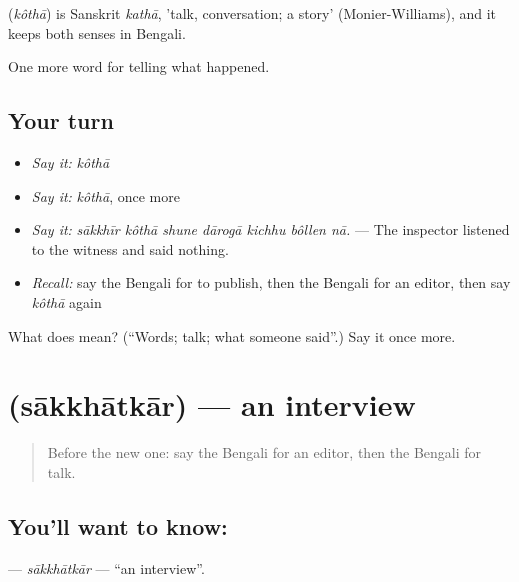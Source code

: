 \begin{cousinweb}
\textbf{} (\emph{kôthā}) is Sanskrit \emph{kathā}, 'talk, conversation; a story' (Monier-Williams), and it keeps both senses in Bengali.
\end{cousinweb}

\begin{grammarlens}[title={What you've built}]
One more word for telling what happened.
\end{grammarlens}

\subsection*{Your turn}
\begin{itemize}
\raggedright
  \item \emph{Say it:} \emph{kôthā}
  \item \emph{Say it:} \emph{kôthā}, once more
  \item \emph{Say it:} \emph{sākkhīr kôthā shune dārogā kichhu bôllen nā.} — The inspector listened to the witness and said nothing.
  \item \emph{Recall:} say the Bengali for to publish, then the Bengali for an editor, then say \emph{kôthā} again
\end{itemize}

\begin{tcolorbox}[breakable,colback=teal!4,colframe=teal!35!black,title={Before you move on}]
What does  mean? (\textquotedblleft{}Words; talk; what someone said\textquotedblright{}.) Say it once more.
\end{tcolorbox}
\section[\texorpdfstring{\bn{সাক্ষাৎকার} (sākkhātkār)}{সাক্ষাৎকার (sākkhātkār)}]{ (sākkhātkār) — an interview}

\label{lesson:BN-C297-sakkhatkar}



\begin{quote}
Before the new one: say the Bengali for an editor, then the Bengali for talk.
\end{quote}

\subsection*{You'll want to know: }
\textbf{} — \emph{sākkhātkār} — \textquotedblleft{}an interview\textquotedblright{}.

